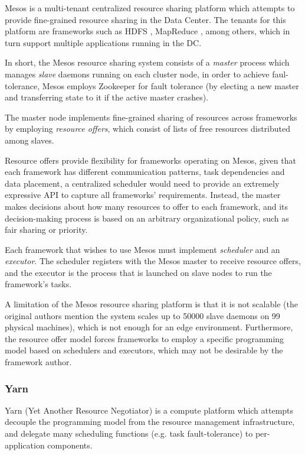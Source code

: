 Mesos \cite{hindman2011mesos} is a multi-tenant centralized resource sharing platform which attempts to provide fine-grained resource sharing in the  Data Center. The tenants for this platform are frameworks such as HDFS \cite{borthakur2008hdfs}, MapReduce \cite{dean2008mapreduce}, among others, which in turn support multiple applications running in the DC.

In short, the Mesos resource sharing system consists of a \textit{master} process which manages \textit{slave} daemons running on each cluster node, in order to achieve faul-tolerance, Mesos employs Zookeeper \cite{hunt2010zookeeper} for fault tolerance (by electing a new master and transferring state to it if the active master crashes).

The master node implements fine-grained sharing of resources across frameworks by employing \textit{resource offers}, which consist of lists of free resources distributed among slaves.

Resource offers provide flexibility for frameworks operating on Mesos, given that each framework has different communication patterns, task dependencies and data placement, a centralized scheduler would need to provide an extremely expressive API to capture all frameworks' requirements. Instead, the master makes decisions about how many resources to offer to each framework, and its decision-making process is based on an arbitrary organizational policy, such as fair sharing or priority. 

Each framework that wishes to use Mesos must implement \textit{scheduler} and an \textit{executor}. The scheduler registers with the Mesos master to receive resource offers, and the executor is the process that is launched on slave nodes to run the framework's tasks.

A limitation of the Mesos resource sharing platform is that it is not scalable (the original authors mention the system scales up to 50000 slave daemons on 99 physical machines), which is not enough for an edge environment. Furthermore, the resource offer model forces frameworks to employ a specific programming model based on schedulers and executors, which may not be desirable by the framework author.

\subsubsection{Yarn}

Yarn (Yet Another Resource Negotiator) \cite{Vavilapalli2013ApacheHY} is a compute platform which attempts decouple the programming model from the resource management infrastructure, and delegate many scheduling functions (e.g. task fault-tolerance) to per-application components. 

